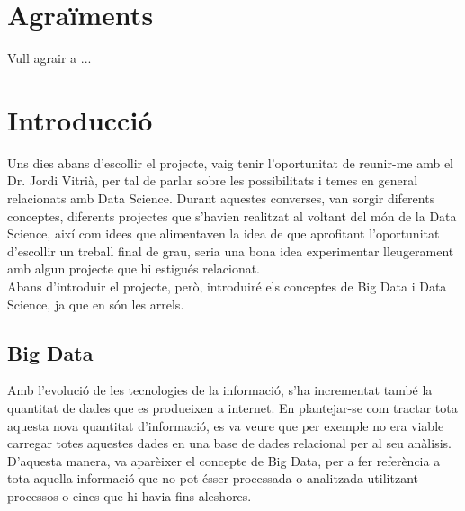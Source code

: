\documentclass[12pt,a4paper,openright,oneside]{article}
\numberwithin{equation}{section}
\theoremstyle{definition}
\begin{document}
\newpage 


\section*{Agraïments}

Vull agrair a ... 
\newpage

\tableofcontents

\newpage

\setcounter{page}{1}
\section{Introducció}
Uns dies abans d'escollir el projecte, vaig tenir l'oportunitat de reunir-me amb el Dr. Jordi Vitrià, per tal de parlar sobre les possibilitats i temes en general relacionats amb Data Science. Durant aquestes converses, van sorgir diferents conceptes, diferents projectes que s'havien realitzat al voltant del món de la Data Science, així com idees que alimentaven la idea de que aprofitant l'oportunitat d'escollir un treball final de grau, seria una bona idea experimentar lleugerament amb algun projecte que hi estigués relacionat.\\
Abans d'introduir el projecte, però, introduiré els conceptes de Big Data i Data Science, ja que en són les arrels.
\subsection{Big Data}
Amb l'evolució de les tecnologies de la informació, s'ha incrementat també la quantitat de dades que es produeixen a internet. En plantejar-se com tractar tota aquesta nova quantitat d'informació, es va veure que per exemple no era viable carregar totes aquestes dades en una base de dades relacional per al seu anàlisis. D'aquesta manera, va aparèixer el concepte de Big Data, per a fer referència a tota aquella informació que no pot ésser processada o analitzada utilitzant processos o eines que hi havia fins aleshores.\\
\end{document}
